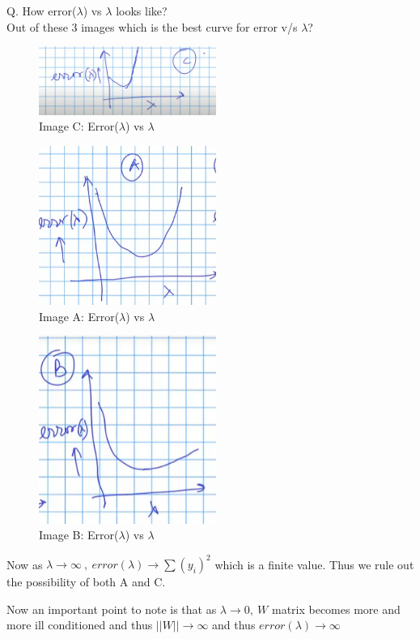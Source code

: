 \documentclass[11pt, twosides]{article}
\begin{document}
\begin{flushleft}
Q. How error($\lambda$) vs $\lambda$ looks like?\\
Out of these 3 images which is the best curve for error v/s $\lambda$?
\color{blue}

\begin{figure}[h]
    \centering
    \includegraphics[width = 5.8cm]{image_C.PNG}
    \caption{Image C: Error($\lambda$) vs $\lambda$}
\end{figure}
\newpage
\begin{figure}[h]
    \centering
    \includegraphics[width = 5.8cm]{image_A.PNG}
    \caption{Image A: Error($\lambda$) vs $\lambda$}
\end{figure}
\begin{figure}[h]
    \centering
    \includegraphics[width = 5.8cm]{image_B.PNG}
    \caption{Image B: Error($\lambda$) vs $\lambda$}
\end{figure}

Now as $\lambda \rightarrow \infty \ , \ error(\lambda) \rightarrow \sum (y_i)^2$ which is a finite value. Thus we rule out the possibility of both A and C.

Now an important point to note is that as $\lambda \rightarrow 0, \ W$ matrix becomes more and more ill conditioned and thus $||W||\rightarrow \infty$ and thus $error(\lambda) \rightarrow \infty$

\end{flushleft}
\end{document}
